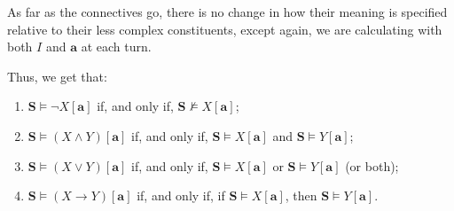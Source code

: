 As far as the connectives go, there is no change in how their meaning is specified relative to their less complex constituents, except again, we are calculating with both $I$ and $\mathbf{a}$ at each turn. 

Thus, we get that:

\begin{enumerate}
	\item $\mathbf{S} \models \neg X[\mathbf{a}]$ if, and only if, $\mathbf{S} \not\models X[\mathbf{a}]$;
	\item $\mathbf{S} \models (X \wedge Y)[\mathbf{a}]$ if, and only if, $\mathbf{S} \models X[\mathbf{a}]$ and $\mathbf{S}\models Y[\mathbf{a}]$;
	\item $\mathbf{S} \models (X \vee Y)[\mathbf{a}]$ if, and only if, $\mathbf{S} \models X[\mathbf{a}]$ or $\mathbf{S}\models Y[\mathbf{a}]$ (or both);
	\item $\mathbf{S} \models (X \rightarrow Y)[\mathbf{a}]$ if, and only if, if $\mathbf{S} \models X[\mathbf{a}]$, then $\mathbf{S} \models Y[\mathbf{a}]$. 
\end{enumerate}